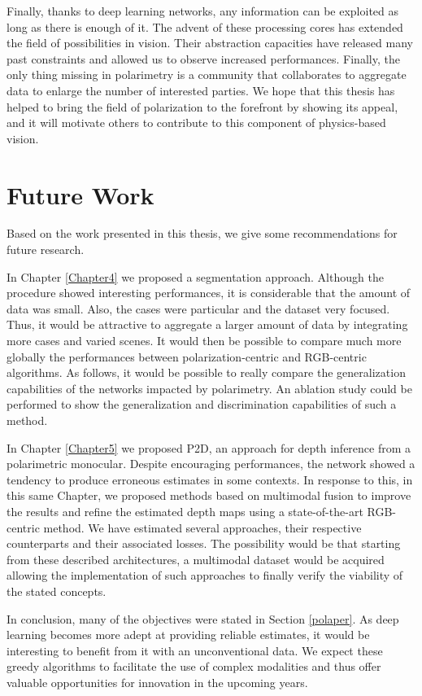 Finally, thanks to deep learning networks, any information can be exploited as long as there is enough of it. The advent of these processing cores has extended the field of possibilities in vision. Their abstraction capacities have released many past constraints and allowed us to observe increased performances. Finally, the only thing missing in polarimetry is a community that collaborates to aggregate data to enlarge the number of interested parties. We hope that this thesis has helped to bring the field of polarization to the forefront by showing its appeal, and it will motivate others to contribute to this component of physics-based vision.

\section{Future Work}

Based on the work presented in this thesis, we give some recommendations for future research.


In Chapter \ref{Chapter4} we proposed a segmentation approach. Although the procedure showed interesting performances, it is considerable that the amount of data was small. Also, the cases were particular and the dataset very focused. Thus, it would be attractive to aggregate a larger amount of data by integrating more cases and varied scenes. It would then be possible to compare much more globally the performances between polarization-centric and RGB-centric algorithms. As follows, it would be possible to really compare the generalization capabilities of the networks impacted by polarimetry. An ablation study could be performed to show the generalization and discrimination capabilities of such a method.


In Chapter \ref{Chapter5} we proposed P2D, an approach for depth inference from a polarimetric monocular. Despite encouraging performances, the network showed a tendency to produce erroneous estimates in some contexts. In response to this, in this same Chapter, we proposed methods based on multimodal fusion to improve the results and refine the estimated depth maps using a state-of-the-art RGB-centric method. We have estimated several approaches, their respective counterparts and their associated losses. The possibility would be that starting from these described architectures, a multimodal dataset would be acquired allowing the implementation of such approaches to finally verify the viability of the stated concepts.


In conclusion, many of the objectives were stated in Section \ref{polaper}. As deep learning becomes more adept at providing reliable estimates, it would be interesting to benefit from it with an unconventional data. We expect these greedy algorithms to facilitate the use of complex modalities and thus offer valuable opportunities for innovation in the upcoming years.



